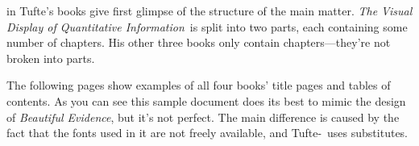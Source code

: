 \documentclass[a4paper]{tufte-book}
\newcommand{\VDQI}{\textit{The Visual Display of Quantitative Information}\xspace}
\newcommand{\BE}{\textit{Beautiful Evidence}\xspace}
\newcommand{\TL}{Tufte-\hologo{LaTeX}\xspace}
\begin{document}
 in Tufte's books give first glimpse of the structure of the main matter.
\VDQI\ is split into two parts, each containing some number of chapters.
His other three books only contain chapters---they're not broken into parts.

The following pages show examples of all four books' title pages and tables of contents.
As you can see this sample document does its best to mimic the design of \BE, but it's not perfect.
The main difference is caused by the fact that the fonts used in it are not freely available, and \TL\ uses substitutes.

\begin{figure}[p]
\hfill
{}
\\\vspace{\baselineskip}

\end{figure}
\end{document}
